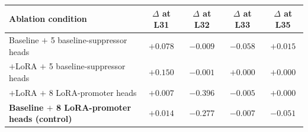 \begin{tabular}{lcccc}
\toprule
\textbf{Ablation condition} & \textbf{$\Delta$ at L31} & \textbf{$\Delta$ at L32} & \textbf{$\Delta$ at L33} & \textbf{$\Delta$ at L35} \\
\midrule
Baseline $+$ 5 baseline-suppressor heads        & $+0.078$ & $-0.009$ & $-0.058$ & $+0.015$ \\
$+$LoRA   $+$ 5 baseline-suppressor heads        & $+0.150$ & $-0.001$ & $+0.000$ & $+0.000$ \\
$+$LoRA   $+$ 8 LoRA-promoter heads             & $+0.007$ & $\mathbf{-0.396}$ & $-0.005$ & $+0.000$ \\
\textbf{Baseline $+$ 8 LoRA-promoter heads (control)} & $+0.014$ & $\mathbf{-0.277}$ & $-0.007$ & $-0.051$ \\
\bottomrule
\end{tabular}
